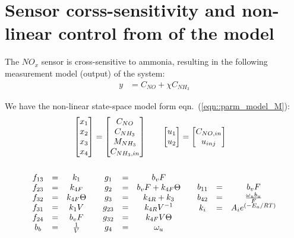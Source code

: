 \section{Sensor corss-sensitivity and non-linear control from of the model}

The $NO_x$ sensor is cross-sensitive to ammonia, resulting in the following
measurement model (output) of the system:
\begin{align*}
    y &= C_{NO} + \chi C_{NH_3}
\end{align*}

We have the non-linear state-space model form eqn.~(\ref{eqn::parm_model_M}):
\begin{align*}
    \begin{bmatrix} x_1 \\ x_2 \\ x_3 \\ x_4 \end{bmatrix} = \begin{bmatrix} C_{NO} \\ C_{NH_3} \\ M_{NH_3} \\ C_{NH_3, in} \end{bmatrix} \qquad &
    \begin{bmatrix} u_1 \\ u_2  \end{bmatrix} = \begin{bmatrix} C_{NO, in} \\ u_{inj} \end{bmatrix}
\end{align*}
\begin{align*}
    \begin{matrix} 
    \\f_{13} &=& k_1
    \\f_{23} &=& k_{4F}
    \\f_{32} &=& k_{4F} \Theta
    \\f_{31} &=& k_1 V
    \\f_{24} &=& b_v F
    \\ b_b &=& \frac{1}{V}
     \end{matrix}
    \qquad
    \begin{matrix} 
    \\ g_1    &=& b_v F
    \\ g_2    &=& b_v F + k_{4F} \Theta
    \\ g_{3}  &=& k_{4R}+k_3
    \\ g_{23} &=& k_{4R} V^{-1}
    \\ g_{32} &=& k_{4F} V \Theta
    \\ g_4 &=& \omega_u
     \end{matrix}
    \qquad
    \begin{matrix} 
        b_{11} &=& b_v F
        \\
        b_{42} &=& \frac{\omega_u b_u}{F}
        \\ k_i &=& A_i e^{\left( -E_a/RT \right)}
     \end{matrix}
\end{align*}
